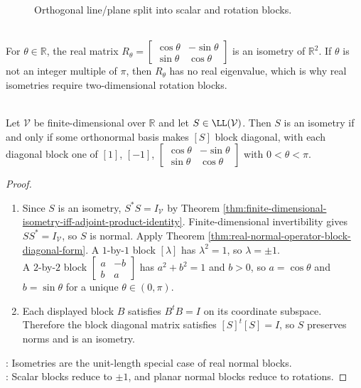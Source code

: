 \begin{figure}[H]
  \centering
  
  \caption{Orthogonal line/plane split into scalar and rotation blocks.}
  \label{fig:real-normal-block-structure}
\end{figure}

\begin{example} \label{ex:plane-rotation-isometry} \\
For $\theta\in\mathbb{R}$, the real matrix $R_{\theta}=
\begin{bmatrix}
\cos\theta&-\sin\theta\\
\sin\theta&\cos\theta
\end{bmatrix}$ is an isometry of $\mathbb{R}^2$. If $\theta$ is not an integer multiple of $\pi$, then $R_{\theta}$ has no real eigenvalue, which is why real isometries require two-dimensional rotation blocks.
\end{example}

\begin{theorem} \label{thm:real-isometry-block-diagonal-form} \\
Let $\mathcal{V}$ be finite-dimensional over $\mathbb{R}$ and let $S\in\LL(\mathcal{V})$. Then $S$ is an isometry if and only if some orthonormal basis makes $[S]$ block diagonal, with each diagonal block one of $[1]$, $[-1]$, $\begin{bmatrix}
\cos\theta&-\sin\theta\\
\sin\theta&\cos\theta
\end{bmatrix}$ with $0<\theta<\pi$.
\begin{proof}
\begin{enumerate}[label=\roman*.]
\setlength{\itemsep}{0pt}
\item[$(\Rightarrow)$] Since $S$ is an isometry, $S^*S=I_{\mathcal{V}}$ by Theorem \ref{thm:finite-dimensional-isometry-iff-adjoint-product-identity}. Finite-dimensional invertibility gives $SS^*=I_{\mathcal{V}}$, so $S$ is normal. Apply Theorem \ref{thm:real-normal-operator-block-diagonal-form}. A $1$-by-$1$ block $[\lambda]$ has $\lambda^2=1$, so $\lambda=\pm1$.\\
A $2$-by-$2$ block $\begin{bmatrix}a&-b\\b&a\end{bmatrix}$ has $a^2+b^2=1$ and $b>0$, so $a=\cos\theta$ and $b=\sin\theta$ for a unique $\theta\in(0,\pi)$.
\item[$(\Leftarrow)$] Each displayed block $B$ satisfies $B^tB=I$ on its coordinate subspace. Therefore the block diagonal matrix satisfies $[S]^t[S]=I$, so $S$ preserves norms and is an isometry.
\end{enumerate}
: Isometries are the unit-length special case of real normal blocks.\\
: Scalar blocks reduce to $\pm1$, and planar normal blocks reduce to rotations.
\end{proof}
\end{theorem}

